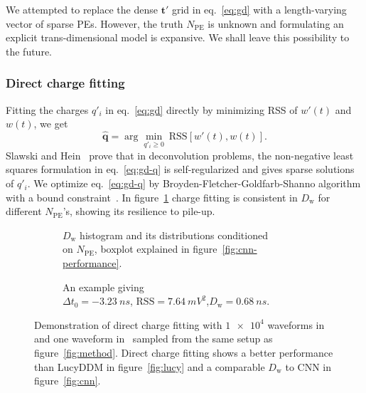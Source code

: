 We attempted to replace the dense $\bm{t'}$ grid in eq.~\eqref{eq:gd} with a length-varying vector of sparse PEs. However, the truth $N_\mathrm{PE}$ is unknown and formulating an explicit trans-dimensional model is expansive.  We shall leave this possibility to the future.

\subsubsection{Direct charge fitting}
\label{sec:dcf}

Fitting the charges $q'_i$ in eq.~\eqref{eq:gd} directly by minimizing RSS of $w'(t)$ and $w(t)$, we get
\begin{equation}
  \label{eq:gd-q}
  \bm{\hat{q}} = \arg \underset{q'_i \ge 0}{\min}~\mathrm{RSS}\left[w'(t),w(t)\right].
\end{equation}
Slawski and Hein~\cite{slawski_non-negative_2013} prove that in deconvolution problems, the non-negative least squares formulation in eq.~\eqref{eq:gd-q} is self-regularized and gives sparse solutions of $q'_i$.  We optimize eq.~\eqref{eq:gd-q} by Broyden-Fletcher-Goldfarb-Shanno algorithm with a bound constraint~\cite{byrd_limited_1995}.  In figure~\ref{fig:fitting-npe} charge fitting is consistent in $D_\mathrm{w}$ for different $N_\mathrm{PE}$'s, showing its resilience to pile-up.

\begin{figure}[H]
  \begin{subfigure}{.5\textwidth}
    \centering
    \resizebox{\textwidth}{!}{}
    \caption{\label{fig:fitting-npe} $D_\mathrm{w}$ histogram and its distributions conditioned \\ on $N_{\mathrm{PE}}$, boxplot explained in figure~\ref{fig:cnn-performance}.}
  \end{subfigure}
  \begin{subfigure}{.5\textwidth}
    \centering
    \resizebox{\textwidth}{!}{}
    \caption{\label{fig:fitting}An example giving \\ $\Delta{t_0}=\SI{-3.23}{ns}$, $\mathrm{RSS}=\SI{7.64}{mV^2}$,$D_\mathrm{w}=\SI{0.68}{ns}$.}
  \end{subfigure}
  \caption{\label{fig:dcf}Demonstration of direct charge fitting with $\num[retain-unity-mantissa=false]{1e4}$ waveforms in~ and one waveform in~ sampled from the same setup as figure~\ref{fig:method}.  Direct charge fitting shows a better performance than LucyDDM in figure~\ref{fig:lucy} and a comparable $D_\mathrm{w}$ to CNN in figure~\ref{fig:cnn}.}
\end{figure}

